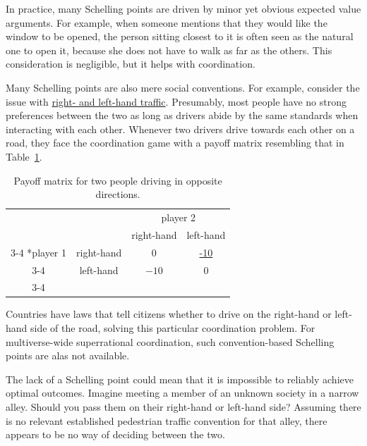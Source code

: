 In practice, many Schelling points are driven by minor yet obvious
expected value arguments. For example, when someone mentions that they
would like the window to be opened, the person sitting closest to it is
often seen as the natural one to open it, because she does not have to
walk as far as the others. This consideration is negligible, but it
helps with coordination.

Many Schelling points are also mere social conventions. For example,
consider the issue with
\href{https://en.wikipedia.org/wiki/Right-_and_left-hand_traffic}{right-
and left-hand traffic}. Presumably, most people have no strong
preferences between the two as long as drivers abide by the same
standards when interacting with each other. Whenever two drivers drive
towards each other on a road, they face the coordination game with a
payoff matrix resembling that in Table~\ref{right-or-left-hand-traffic}.

\renewcommand{\arraystretch}{1.5}
\begin{table}[h!]
    \centering
    \setlength{\extrarowheight}{2pt}
    \begin{tabular}{cc|c|c|}
      & \multicolumn{1}{c}{} & \multicolumn{2}{c}{player 2}\\
      & \multicolumn{1}{c}{} & \multicolumn{1}{c}{right-hand}  & \multicolumn{1}{c}{left-hand} \\\cline{3-4}
      \multirow{2}*{player 1}  & right-hand & $0$ &\href{https://en.wikipedia.org/wiki/Wrong-way_driving}{-10} \\\cline{3-4}
      & left-hand & $-10$ & $0$ \\\cline{3-4}
    \end{tabular}
    \caption{Payoff matrix for two people driving in opposite directions.}
    \label{right-or-left-hand-traffic}
\end{table}

Countries have laws that tell citizens whether to drive on the
right-hand or left-hand side of the road, solving this particular
coordination problem. For multiverse-wide superrational coordination,
such convention-based Schelling points are alas not available.

The lack of a Schelling point could mean that it is impossible to
reliably achieve optimal outcomes. Imagine meeting a member of an
unknown society in a narrow alley. Should you pass them on their
right-hand or left-hand side? Assuming there is no relevant established
pedestrian traffic convention for that alley, there appears to be no way
of deciding between the two.

